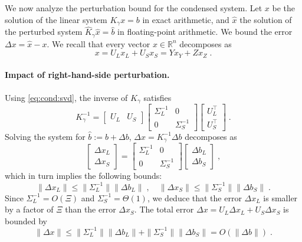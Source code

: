 \documentclass[smallextended]{svjour3}
\begin{document}
We now analyze the perturbation bound for the condensed system.
Let $x$ be the solution of the linear system $K_\gamma x = b$
in exact arithmetic, and $\widehat{x}$ the solution of
the perturbed system $\widehat{K}_\gamma \widehat{x} = \widehat{b}$
in floating-point arithmetic. We bound
the error $\Delta x = \widehat{x} - x$. We
recall that every vector $x \in \mathbb{R}^n$ decomposes as
\begin{equation}
  x = U_L x_L + U_S x_S = Y x_Y + Z x_Z \; .
\end{equation}

\paragraph{Impact of right-hand-side perturbation.}
Using \eqref{eq:cond:svd}, the inverse of
$K_\gamma$ satisfies
\begin{equation}
  \label{eq:cond:inversecondensed}
  K_\gamma^{-1}  = \begin{bmatrix} U_L & U_S \end{bmatrix}
  \begin{bmatrix}
    \Sigma_L^{-1} & 0 \\ 0 & \Sigma_S^{-1}
  \end{bmatrix}
  \begin{bmatrix}
    U_L^\top \\ U_S^\top
  \end{bmatrix}
  \; .
\end{equation}
Solving the system for $\widehat{b} := b + \Delta b$,
$\Delta x = K_\gamma^{-1} \Delta b$ decomposes as
\begin{equation}
  \begin{bmatrix}
    \Delta x_L \\ \Delta x_S
  \end{bmatrix}
  =
  \begin{bmatrix}
    \Sigma_L^{-1} & 0 \\ 0 & \Sigma_S^{-1}
  \end{bmatrix}
  \begin{bmatrix}
    \Delta b_L \\ \Delta b_S
  \end{bmatrix}
  \; ,
\end{equation}
which in turn implies the following bounds:
\begin{equation}
  \label{eq:cond:rhserror}
     \| \Delta x_L \| \leq \| \Sigma_L^{-1} \| \| \Delta b_L \| \; ,\quad
    \| \Delta x_S \| \leq \| \Sigma_S^{-1} \| \| \Delta b_S \| \; .
\end{equation}
Since $\Sigma_L^{-1} = O(\Xi)$ and $\Sigma_S^{-1} = \Theta(1)$,
we deduce that the error $\Delta x_L$ is smaller by a factor
of $\Xi$ than the error $\Delta x_S$. The total error
$\Delta x = U_L \Delta x_L + U_S \Delta x_S$ is bounded by
\begin{equation}
  \label{eq:cond:rhserrorfull}
  \| \Delta x \|
  \leq  \| \Sigma_L^{-1} \| \| \Delta b_L \| + \| \Sigma_S^{-1} \| \| \Delta b_S \| =
  O(\|\Delta b \|) \; .
\end{equation}
\end{document}
